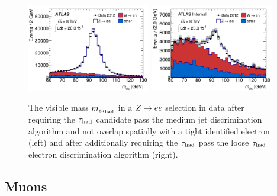 \begin{figure}[tp]
  \centering
  \includegraphics[width=0.48\textwidth]{figures/PERF-2013-06/fig_14a}
  \includegraphics[width=0.48\textwidth]{figures/PERF-2013-06/eveto_mvis_mediumID_loosePPOLR_looseeveto}
  \caption{The visible mass $m_{e\tau_\text{had}}$ in a $Z \rightarrow ee$ selection in data after requiring the $\tau_\text{had}$ candidate pass the medium jet discrimination algorithm and not overlap spatially with a tight identified electron (left) and after additionally requiring the $\tau_\text{had}$ pass the loose $\tau_\text{had}$ electron discrimination algorithm (right).}
  \label{fig:taus-electronfakes2}
\end{figure}

\subsection{Muons}


